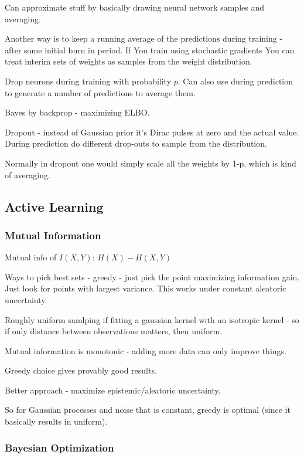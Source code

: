 \documentclass{article}
\begin{document}
		Can approximate stuff by basically drawing neural network samples and averaging.
		
		Another way is to keep a running average of the predictions during training - after some initial burn in period. If You train using stochastic gradients You can treat interim sets of weights as samples from the weight distribution.
		
		Drop neurons during training with probability $p$. Can also use during prediction to generate a number of predictions to average them.
		
		Bayes by backprop - maximizing ELBO.
		
		Dropout - instead of Gaussian prior it's Dirac pulses at zero and the actual value. During prediction do different drop-outs to sample from the distribution.
		
		Normally in dropout one would simply scale all the weights by 1-p, which is kind of averaging.
		
	\subsection{Active Learning}
	
		\subsubsection{Mutual Information}
		
			Mutual info of $I(X, Y)$: $H(X) - H(X, Y)$
	
			Ways to pick best sets - greedy - just pick the point maximizing information gain. Just look for points with largest variance. This works under constant aleatoric uncertainty.
			
			Roughly uniform samlping if fitting a gaussian kernel with an isotropic kernel - so if only distance between observations matters, then uniform.
			
			Mutual information is monotonic - adding more data can only improve things.
			
			Greedy choice gives provably good results.
			
			Better approach - maximize epistemic/aleatoric uncertainty.
			
			So for Gaussian processes and noise that is constant, greedy is optimal (since it basically results in uniform).
			
		\subsubsection{Bayesian Optimization}
		
\end{document}
